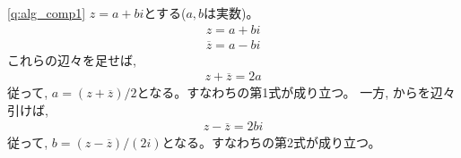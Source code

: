 \ref{q:alg_comp1} $z=a+bi$とする($a, b$は実数)。
\begin{eqnarray} 
z=a + bi\label{eq:univ_comp_ReIm_ans1}\\
\overline{z}=a-bi\label{eq:univ_comp_ReIm_ans2}
\end{eqnarray}
これらの辺々を足せば, 
\begin{eqnarray*}z+\overline{z}=2a\end{eqnarray*}
従って, $a=(z+\overline{z})/2$となる。すなわちの第1式が成り立つ。
一方, からを辺々引けば, 
\begin{eqnarray*}z-\overline{z}=2bi\end{eqnarray*}
従って, $b=(z-\overline{z})/(2i)$となる。すなわちの第2式が成り立つ。
\mv

